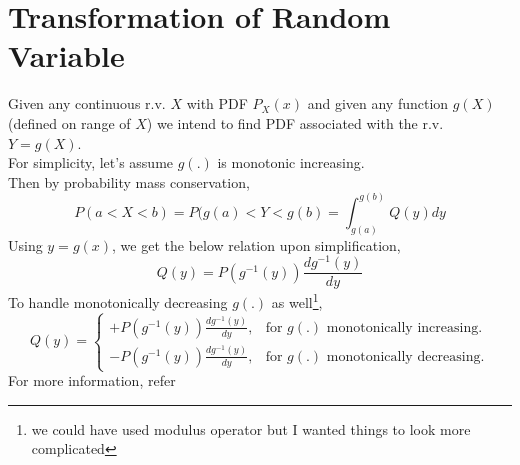 \documentclass{article}
\begin{document}
\section{Transformation of Random Variable}
Given any continuous r.v. $X$ with PDF $P_{X}(x)$ and given any function $g(X)$(defined on range of $X$) we intend to find PDF associated with the r.v. $Y=g(X)$.\\
For simplicity, let’s assume $g(.)$ is monotonic increasing.\\
Then by probability mass conservation,
\[ P(a< X < b) = P(g(a)< Y < g(b) = \int_{g(a)}^{g(b)} Q(y)dy \]
Using $y = g(x)$, we get the below relation upon simplification,
\[Q(y) = P(g^{-1}(y))\frac{dg^{-1}(y)}{dy}\]
To handle monotonically decreasing $g(.)$ as well\footnote[1]{we could have used modulus operator but I wanted things to look more complicated},
\begin{equation}
    Q(y) = \begin{cases}
        +P(g^{-1}(y))\frac{dg^{-1}(y)}{dy}, & \text{for } g(.) \text{ monotonically increasing.}\\
        -P(g^{-1}(y))\frac{dg^{-1}(y)}{dy}, & \text{for } g(.) \text{ monotonically decreasing.}
    \end{cases}
\end{equation}
For more information, refer \cite{link1}
\end{document}

